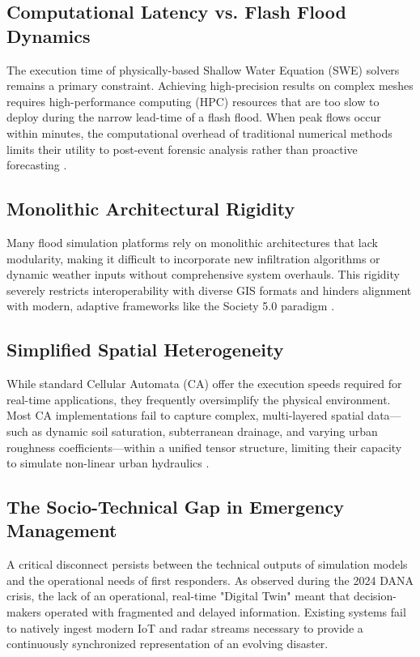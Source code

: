 \subsection{Computational Latency vs. Flash Flood Dynamics}

The execution time of physically-based Shallow Water Equation (SWE) solvers remains a primary constraint. Achieving high-precision results 
on complex meshes requires high-performance computing (HPC) resources that are too slow to deploy during the narrow lead-time of a flash 
flood. When peak flows occur within minutes, the computational overhead of traditional numerical methods limits their utility to post-event 
forensic analysis rather than proactive forecasting \parencite{Muoz2025}.

\subsection{Monolithic Architectural Rigidity}

Many flood simulation platforms rely on monolithic architectures that lack modularity, making it difficult to incorporate new infiltration 
algorithms or dynamic weather inputs without comprehensive system overhauls. This rigidity severely restricts interoperability with diverse 
GIS formats and hinders alignment with modern, adaptive frameworks like the Society 5.0 paradigm \parencite{FonsecaiCasas2026}.

\subsection{Simplified Spatial Heterogeneity}

While standard Cellular Automata (CA) offer the execution speeds required for real-time applications, they frequently oversimplify the 
physical environment. Most CA implementations fail to capture complex, multi-layered spatial data—such as dynamic soil saturation, 
subterranean drainage, and varying urban roughness coefficients—within a unified tensor structure, limiting their capacity to simulate 
non-linear urban hydraulics \parencite{Fonseca2011}.

\subsection{The Socio-Technical Gap in Emergency Management}

A critical disconnect persists between the technical outputs of simulation models and the operational needs of first responders. As 
observed during the 2024 DANA crisis, the lack of an operational, real-time "Digital Twin" meant that decision-makers operated with 
fragmented and delayed information. Existing systems fail to natively ingest modern IoT and radar streams necessary to provide a 
continuously synchronized representation of an evolving disaster.


